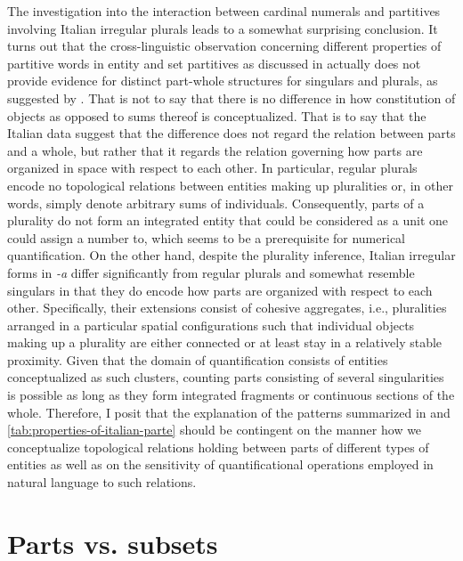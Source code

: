 The investigation into the interaction between cardinal numerals and partitives involving Italian irregular plurals leads to a somewhat surprising conclusion. It turns out that the cross-linguistic observation concerning different properties of partitive words in entity and set partitives as discussed in  actually does not provide evidence for distinct part-whole structures for singulars and plurals, as suggested by \citet{schwarzschild1996pluralities}. That is not to say that there is no difference in how constitution of objects as opposed to sums thereof is conceptualized. That is to say that the Italian data suggest that the difference does not regard the relation between parts and a whole, but rather that it regards the relation governing how parts are organized in space with respect to each other. In particular, regular plurals encode no topological relations between entities making up pluralities or, in other words, simply denote arbitrary sums of individuals. Consequently, parts of a plurality do not form an integrated entity that could be considered as a unit one could assign a number to, which seems to be a prerequisite for numerical quantification. On the other hand, despite the plurality inference, Italian irregular forms in \textit{-a} differ significantly from regular plurals and somewhat resemble singulars in that they do encode how parts are organized with respect to each other. Specifically, their extensions consist of cohesive aggregates, i.e., pluralities arranged in a particular spatial configurations such that individual objects making up a plurality are either connected or at least stay in a relatively stable proximity. Given that the domain of quantification consists of entities conceptualized as such clusters, counting parts consisting of several singularities is possible as long as they form integrated fragments or continuous sections of the whole. Therefore, I posit that the explanation of the patterns summarized in  and \ref{tab:properties-of-italian-parte} should be contingent on the manner how we conceptualize topological relations holding between parts of different types of entities as well as on the sensitivity of quantificational operations employed in natural language to such relations.

\section{Parts vs. subsets}\label{sec:parts-vs-subsets}

